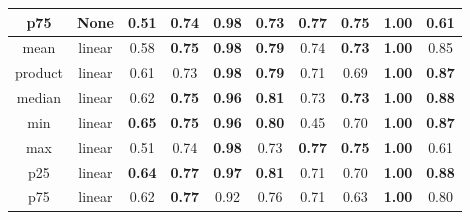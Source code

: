 \begin{table*}[!b]
\begin{tabular}{|c|c|c|c|c|c|c|c|c|c|}
        \hline
                    p75 &            None &                         0.51 &                         0.74 &             \textbf{0.98} &                     0.73 &           \textbf{0.77} &           \textbf{0.75} &          \textbf{1.00} &                         0.61 \\
        \hline
                   mean &          linear &                         0.58 &                \textbf{0.75} &             \textbf{0.98} &            \textbf{0.79} &                    0.74 &           \textbf{0.73} &          \textbf{1.00} &                         0.85 \\
        \hline
                product &          linear &                         0.61 &                         0.73 &             \textbf{0.98} &            \textbf{0.79} &                    0.71 &                    0.69 &          \textbf{1.00} &                \textbf{0.87} \\
        \hline
                 median &          linear &                         0.62 &                \textbf{0.75} &             \textbf{0.96} &            \textbf{0.81} &                    0.73 &           \textbf{0.73} &          \textbf{1.00} &                \textbf{0.88} \\
        \hline
                    min &          linear &                \textbf{0.65} &                \textbf{0.75} &             \textbf{0.96} &            \textbf{0.80} &                    0.45 &                    0.70 &          \textbf{1.00} &                \textbf{0.87} \\
        \hline
                    max &          linear &                         0.51 &                         0.74 &             \textbf{0.98} &                     0.73 &           \textbf{0.77} &           \textbf{0.75} &          \textbf{1.00} &                         0.61 \\
        \hline
                    p25 &          linear &                \textbf{0.64} &                \textbf{0.77} &             \textbf{0.97} &            \textbf{0.81} &                    0.71 &                    0.70 &          \textbf{1.00} &                \textbf{0.88} \\
        \hline
                    p75 &          linear &                         0.62 &                \textbf{0.77} &                      0.92 &                     0.76 &                    0.71 &                    0.63 &          \textbf{1.00} &                         0.80 \\

\end{tabular}
\end{table*}
